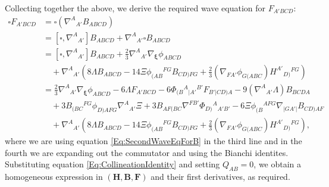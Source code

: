 \documentclass[10pt,a4paper]{article}
\theoremstyle{plain}
\def\bmB{{\bm B}}
\def\bmF{{\bm F}}
\def\bmH{{\bm H}}
\begin{document}
Collecting together the above, we derive the required wave equation for
$F_{A'BCD}$:
\begin{align}
    \square F_{A'BCD} &= \square (\nabla^A{}_{A'}B_{ABCD}) \nonumber\\
    &= \left[\square, \nabla^A{}_{A'}\right] B_{ABCD} + \nabla^A{}_{A'}\square B_{ABCD} \\
    &= \left[\square, \nabla^A{}_{A'}\right] B_{ABCD} + \tfrac{2}{3}\nabla^A{}_{A'}\nabla_{\bm\xi}\phi_{ABCD} \nonumber\\
    &\quad+ \nabla^A{}_{A'}\left(8\Lambda B_{ABCD} - 14\Xi \phi_{(AB}{}^{FG}B_{CD)FG} + \tfrac{2}{3}(\nabla_{FA'}\phi_{G(ABC})H^{A'}{}_{D)}{}^{FG}\right)\nonumber\\
    &=   \tfrac{2}{3}\nabla^A{}_{A'}\nabla_{\bm\xi}\phi_{ABCD} -6 \Lambda F_{A'BCD} - 6 \Phi_{(B}{}^{A}{}_{\vert A'}{}^{B'} F_{B'\vert CD)A} - 9 (\nabla^{A}{}_{A'}\Lambda)B_{BCDA} \nonumber \\
    &\quad + 3B_{(BC}{}^{FG} \phi_{D)AFG} \nabla^{A}{}_{A'}\Xi  + 3B_{AF(BC} \nabla^{FB'}\Phi_{D)}{}^{A}{}_{A'B'}  - 6 \Xi \phi_{(B}{}^{AFG} \nabla_{\vert GA'\vert}B_{CD)AF} \nonumber\\
    &\quad + \nabla^A{}_{A'}\left(8\Lambda B_{ABCD} - 14\Xi \phi_{(AB}{}^{FG}B_{CD)FG} + \tfrac{2}{3}(\nabla_{FA'}\phi_{G(ABC})H^{A'}{}_{D)}{}^{FG}\right) \label{Eq:WaveEqForF},
\end{align}
where we are using equation \eqref{Eq:SecondWaveEqForB} in the third line and
in the fourth we are expanding out the commutator and using the
Bianchi identites. Substituting equation
\eqref{Eq:CollineationIdentity} and setting $Q_{AB}=0$, we obtain a
homogeneous expression in $(\bmH, \bmB,\bmF)$ and their first
derivatives, as required.  \\
\end{document}
